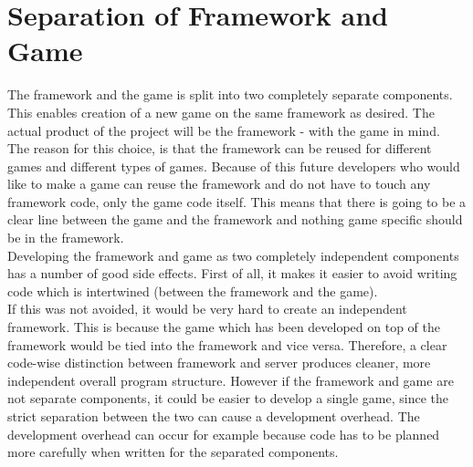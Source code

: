 \section{Separation of Framework and Game}
The framework and the game is split into two completely separate components. This enables creation of a new game on the same framework as desired.  The actual product of the project will be the framework - with the game in mind.
\\

The reason for this choice, is that the framework can be reused for different games and different types of games. Because of this future developers who would like to make a game can reuse the framework and do not have to touch any framework code, only the game code itself. This means that there is going to be a clear line between the game and the framework and nothing game specific should be in the framework.
\\
Developing the framework and game as two completely independent components has a number of good side effects. First of all, it makes it easier to avoid writing code which is intertwined (between the framework and the game).\\

If this was not avoided, it would be very hard to create an independent framework. This is because the game which has been developed on top of the framework would be tied into the framework and vice versa. Therefore, a clear code-wise distinction between framework and server produces cleaner, more independent overall program structure. However if the framework and game are not separate components, it could be easier to develop a single game, since the strict separation between the two can cause a development overhead. The development overhead can occur for example because code has to be planned more carefully when written for the separated components.\\

